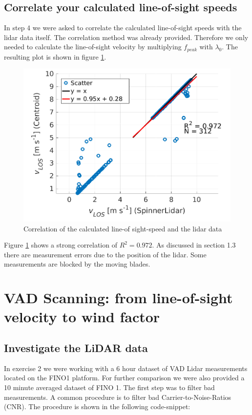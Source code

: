 \documentclass[10pt]{article}
\begin{document}
\subsection{Correlate your calculated line-of-sight speeds}
In step 4 we were asked to correlate the calculated line-of-sight speeds with the lidar data itself. The correlation method was already provided. Therefore we only needed to calculate the line-of-sight velocity by multiplying $f_{peak}$ with $\lambda_0$. The resulting plot is shown in figure \ref{fig:correlation}. 

\begin{figure}[H]
\includegraphics[width=1\linewidth]{../Exercises_and_Tasks/ex1/figures/correlation.png}
\caption{Correlation of the calculated line-of sight-speed and the lidar data}
\label{fig:correlation}
\end{figure}

Figure \ref{fig:correlation} shows a strong correlation of $R^2 = 0.972$. As discussed in section 1.3 there are measurement errors due to the position of the lidar. Some measurements are blocked by the moving blades. 
\section{VAD Scanning: from line-of-sight velocity to wind factor}
\subsection{Investigate the LiDAR data}
In exercise 2 we were working with a 6 hour dataset of VAD Lidar measurements located on the FINO1 platform. For further comparison we were also provided a 10 minute averaged dataset of FINO 1.
The first step was to filter bad measurements. A common procedure is to filter bad Carrier-to-Noise-Ratios (CNR). 
The procedure is shown in the following code-snippet:
\end{document}
